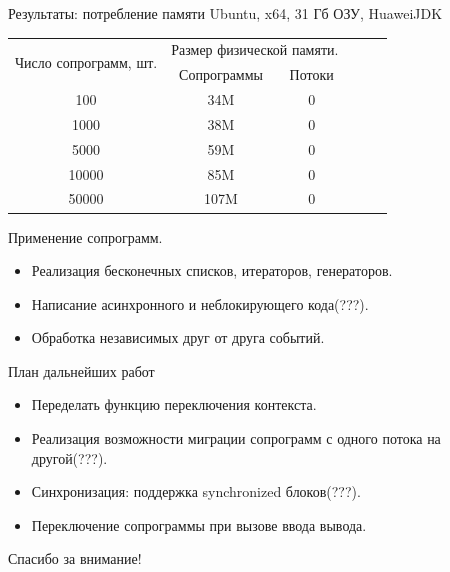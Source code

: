 \begin{frame}{Результаты: потребление памяти}
	Ubuntu, x64, 31 Гб ОЗУ, HuaweiJDK
	\begin{table}[H]
		\begin{tabular}{|c|c|c|c|c|c|}
			\hline \multirow{2}{*}{Число сопрограмм, шт.} & \multicolumn{2}{|c|}{Размер физической памяти.}    \\
			\cline{2-3}    & Сопрограммы  & Потоки  \\
			\hline 100     & 34M          & 0       \\
			\hline 1000    & 38M          & 0       \\
			\hline 5000    & 59M          & 0       \\
			\hline 10000   & 85M          & 0       \\
			\hline 50000   & 107M         & 0       \\ 
			\hline 
		\end{tabular}
	\end{table}
\end{frame}


\begin{frame}{Применение сопрограмм.}
	\begin{itemize}
		\item Реализация бесконечных списков, итераторов, генераторов.
		\item Написание асинхронного и неблокирующего кода(???).
		\item Обработка независимых друг от друга событий.
	\end{itemize}
\end{frame}

\begin{frame}{План дальнейших работ} 
	\begin{itemize}
	\item Переделать функцию переключения контекста.
	\item Реализация возможности миграции сопрограмм с одного потока на другой(???).
	\item Синхронизация: поддержка synchronized блоков(???).
	\item Переключение сопрограммы при вызове ввода вывода.
	\end{itemize}
\end{frame}

\begin{frame}
	\begin{center}
		Спасибо за внимание!
	\end{center}
\end{frame}

